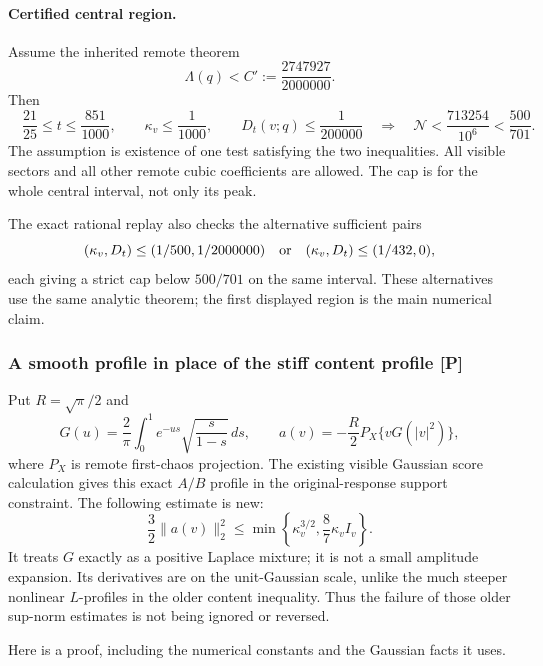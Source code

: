 \paragraph{Certified central region.}
Assume the inherited remote theorem
\[
 \Lambda(q)<C':=\frac{2747927}{2000000}.
\]
Then
\begin{equation}\label{eq:cr-region}
 \boxed{\quad
 \frac{21}{25}\le t\le\frac{851}{1000},\qquad
 \kappa_v\le\frac1{1000},\qquad
 D_t(v;q)\le\frac1{200000}
 \quad\Longrightarrow\quad
 \mathcal N<\frac{713254}{10^6}<\frac{500}{701}.
 \quad}
\end{equation}
The assumption is existence of one test satisfying the two inequalities.
All visible sectors and all other remote cubic coefficients are allowed.
The cap is for the whole central interval, not only its peak.

The exact rational replay also checks the alternative sufficient pairs
\[
 (\kappa_v,D_t)\le(1/500,1/2000000)
 \quad\hbox{or}\quad
 (\kappa_v,D_t)\le(1/432,0),
\]
each giving a strict cap below $500/701$ on the same interval. These
alternatives use the same analytic theorem; the first displayed region
is the main numerical claim.

\subsubsection{A smooth profile in place of the stiff content profile [P]}

Put $R=\sqrt\pi/2$ and
\[
 G(u)=\frac2\pi\int_0^1e^{-us}\sqrt{\frac{s}{1-s}}\,ds,
 \qquad a(v)=-\frac R2P_X\{vG(|v|^2)\},
\]
where $P_X$ is remote first-chaos projection. The existing visible
Gaussian score calculation gives this exact $A/B$ profile in the
original-response support constraint. The following estimate is new:
\begin{equation}\label{eq:cr-profile}
 \boxed{\quad
 \frac32\|a(v)\|_2^2
 \le\min\left\{\kappa_v^{3/2},\frac87\kappa_v I_v\right\}.
 \quad}
\end{equation}
It treats $G$ exactly as a positive Laplace mixture; it is not a small
amplitude expansion. Its derivatives are on the unit-Gaussian scale,
unlike the much steeper nonlinear $L$-profiles in the older content
inequality. Thus the failure of those older sup-norm estimates is not
being ignored or reversed.

Here is a proof, including the numerical constants and the Gaussian
facts it uses.

